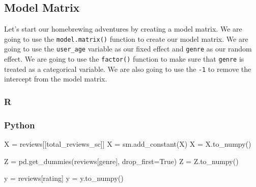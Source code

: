 \documentclass[
  letterpaper,
]{krantz}
\newenvironment{Shaded}{}{}
\newcommand{\DecValTok}[1]{\textcolor[rgb]{0.25,0.63,0.44}{#1}}
\newcommand{\FunctionTok}[1]{\textcolor[rgb]{0.02,0.16,0.49}{#1}}
\newcommand{\NormalTok}[1]{#1}
\newcommand{\OperatorTok}[1]{\textcolor[rgb]{0.40,0.40,0.40}{#1}}
\newcommand{\OtherTok}[1]{\textcolor[rgb]{0.00,0.44,0.13}{#1}}
\newcommand{\SpecialCharTok}[1]{\textcolor[rgb]{0.25,0.44,0.63}{#1}}
\newcommand{\StringTok}[1]{\textcolor[rgb]{0.25,0.44,0.63}{#1}}
\newcommand{\VariableTok}[1]{\textcolor[rgb]{0.10,0.09,0.49}{#1}}
\begin{document}
\subsection{Model Matrix}\label{model-matrix-1}

Let's start our homebrewing adventures by creating a model matrix. We
are going to use the \texttt{model.matrix()} function to create our
model matrix. We are going to use the \texttt{user\_age} variable as our
fixed effect and \texttt{genre} as our random effect. We are going to
use the \texttt{factor()} function to make sure that \texttt{genre} is
treated as a categorical variable. We are also going to use the
\texttt{-1} to remove the intercept from the model matrix.

\subsubsection{R}

\begin{Shaded}
\end{Shaded}

\subsubsection{Python}

\begin{Shaded}
\begin{Highlighting}[]
\NormalTok{X }\OperatorTok{=}\NormalTok{ reviews[[}\StringTok{\textquotesingle{}total\_reviews\_sc\textquotesingle{}}\NormalTok{]]}
\NormalTok{X }\OperatorTok{=}\NormalTok{ sm.add\_constant(X)}
\NormalTok{X }\OperatorTok{=}\NormalTok{ X.to\_numpy()}

\NormalTok{Z }\OperatorTok{=}\NormalTok{ pd.get\_dummies(reviews[}\StringTok{\textquotesingle{}genre\textquotesingle{}}\NormalTok{], drop\_first}\OperatorTok{=}\VariableTok{True}\NormalTok{)}
\NormalTok{Z }\OperatorTok{=}\NormalTok{ Z.to\_numpy()}

\NormalTok{y }\OperatorTok{=}\NormalTok{ reviews[}\StringTok{\textquotesingle{}rating\textquotesingle{}}\NormalTok{]}
\NormalTok{y }\OperatorTok{=}\NormalTok{ y.to\_numpy()}
\end{Highlighting}
\end{Shaded}
\end{document}
